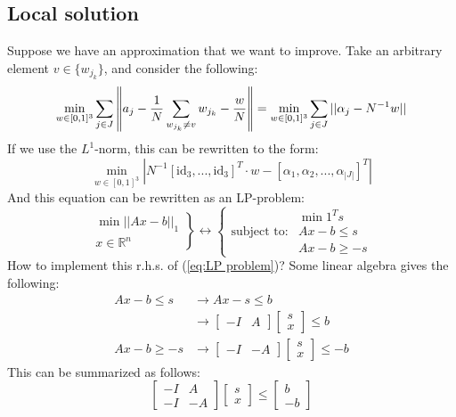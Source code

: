 \documentclass[10pt,a4paper]{article}
\newcommand{\R}{\mathbb{R}}
\newcommand{\id}{\text{id}}
\begin{document}
	\subsection*{Local solution}
	Suppose we have an approximation that we want to improve.
	Take an arbitrary element $v \in \{ w_{j_k} \}$, and consider the following:
	\begin{equation*}
	\min_{w \in [0,1]^3} \sum_{j \in J} \left\lVert a_j - {1 \over N} \sum_{w_{j_k} \neq v} w_{j_k} - {w \over N} \right\rVert = \min_{w \in [0,1]^3} \sum_{j \in J} ||\alpha_j - N^{-1} w||
	\end{equation*}
	If we use the $L^1$-norm, this can be rewritten to the form:
	\begin{equation*}
	\min_{w \in [0,1]^3} |N^{-1}[\id_{3}, ..., \id_{3}]^T \cdot w - [\alpha_1, \alpha_2, ..., \alpha_{|J|}]^T|
	\end{equation*}
	And this equation can be rewritten as an LP-problem:
	\begin{equation}
	\left. \begin{matrix}
	\min ||Ax - b||_1\\
	x \in \R^n
	\end{matrix} \right\} 
	\longleftrightarrow 
	\left\{ \begin{matrix}
	&\min 1^T s\\
	\text{subject to:}& Ax - b \leq s\\
	&Ax-b \geq -s
	\end{matrix}\right.
	\label{eq:LP problem}
	\end{equation}
	How to implement this r.h.s. of (\ref{eq:LP problem})?
	Some linear algebra gives the following:
	\begin{align*}
	Ax - b \leq s &\longrightarrow Ax - s \leq b \\
	&\longrightarrow \begin{bmatrix}-I & A\end{bmatrix} \begin{bmatrix}s\\ x\end{bmatrix} \leq b\\
	Ax - b \geq -s &\longrightarrow \begin{bmatrix}-I & -A\end{bmatrix} \begin{bmatrix}s\\ x\end{bmatrix} \leq -b
	\end{align*}
	This can be summarized as follows:
	\begin{equation}
	\begin{bmatrix}
	-I & A\\
	-I & -A
	\end{bmatrix} 
	\begin{bmatrix}
	s\\ x
	\end{bmatrix} \leq 
	\begin{bmatrix}
	b\\
	-b
	\end{bmatrix}
	\end{equation}
\end{document}
